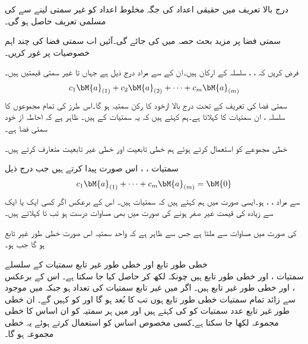 درج بالا تعریف میں حقیقی اعداد کی جگہ مخلوط اعداد کو غیر سمتی لینے سے  کی  مسلمی تعریف حاصل ہو گی۔ 

سمتی فضا پر مزید بحث حصہ  میں کی جائے گی۔آئیں اب سمتی فضا کی چند اہم  خصوصیات پر غور کریں۔

فرض کریں کہ ، ،  سلسلہ  کے ارکان ہیں۔ان کے  سے مراد درج ذیل ہے جہاں  تا  غیر سمتی قیمتیں ہیں۔
\begin{align*}
c_1\bM{a}_{(1)}+c_2\bM{a}_{(2)}+\cdots+c_m\bM{a}_{(m)}
\end{align*}
سمتی فضا کی تعریف کے تحت درج بالا ازخود  کا رکن سمتیہ ہو گا۔اس طرز کی تمام مجموعوں کا سلسلہ ،  ان سمتیات کا  کہلاتا ہے۔ہم کہتے ہیں کہ یہ سمتیات  کے  ہیں۔ ظاہر ہے کہ احاطہ از خود سمتی فضا ہے۔

خطی مجموعے کو استعمال کرتے ہوئے ہم خطی تابعیت اور خطی غیر تابعیت متعارف کرتے ہیں۔


سمتیات ، ،  اس صورت  پیدا کرتے  ہیں جب درج ذیل
\begin{align}
c_1\bM{a}_{(1)}+\cdots+c_m\bM{a}_{(m)}=\bM{0}
\end{align} 
سے مراد ، ،  ہو۔ایسی صورت میں ہم کہتے ہیں کہ سمتیات  ہیں۔ اس کے برعکس اگر کسی ایک یا ایک سے زیادہ  کی قیمت غیر صفر ہونے کی صورت میں بھی مساوات  درست ہو تب  تا    کہلاتے ہیں۔

 کی صورت میں مساوات  سے  ملتا ہے جس سے ظاہر ہے کہ واحد سمتیہ  اس صورت خطی طور غیر تابع ہو گا جب  ہو۔

\quad خطی طور تابع اور خطی طور غیر تابع سمتیات کے سلسلے\\
سمتیات ،  اور  خطی طور تابع ہیں چونکہ
  لکھ کر  حاصل کیا جا سکتا ہے۔ اس کے برعکس ،  اور  خطی طور غیر تابع ہیں۔
اگر  میں غیر تابع سمتیات کی تعداد  ہو  جبکہ  میں موجود   سے زائد  تمام سمتیات خطی طور تابع ہوں تب  کا بُعد  ہو گا اور  کو   کہیں گے۔ ان خطی طور غیر تابع  عدد سمتیات کو  کی  کہتے ہیں اور  میں ہر سمتیہ کو ان اساس کا خطی مجموعہ لکھا جا سکتا ہے۔کسی مخصوص اساس کو استعمال کرتے ہوئے یہ خطی مجموعہ  ہو گا۔


